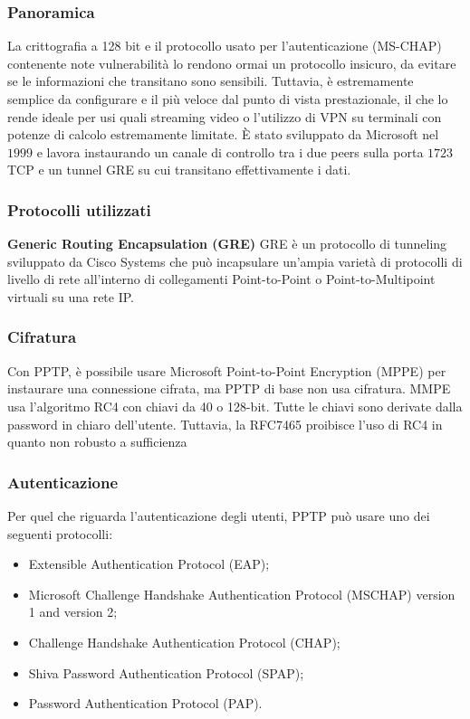 \subsubsection{Panoramica}
La crittografia a 128 bit e il protocollo usato per l'autenticazione (MS-CHAP) contenente note vulnerabilità lo rendono ormai un protocollo insicuro, da evitare se le informazioni che transitano sono sensibili.
Tuttavia, è estremamente semplice da configurare e il più veloce dal punto di vista prestazionale, il che lo rende ideale per usi quali streaming video o l'utilizzo di VPN su terminali con potenze di calcolo estremamente limitate.
È stato sviluppato da Microsoft nel $1999$ \cite[RFC2637]{RFC2637} e lavora instaurando un canale di controllo tra i due peers sulla porta $1723$ TCP e un tunnel GRE  su cui transitano effettivamente i dati.

\subsubsection{Protocolli utilizzati}
\noindent \textbf{Generic Routing Encapsulation (GRE)}
GRE \cite[RFC2784]{RFC2784} è un protocollo di tunneling sviluppato da Cisco Systems che può incapsulare un'ampia varietà di protocolli di livello di rete all'interno di collegamenti Point-to-Point o Point-to-Multipoint virtuali su una rete IP.

\subsubsection{Cifratura}
Con PPTP, è possibile usare Microsoft Point-to-Point Encryption (MPPE) per instaurare una connessione cifrata, ma PPTP di base non usa cifratura. MMPE usa l'algoritmo RC4 con chiavi da 40 o 128-bit. Tutte le chiavi sono derivate dalla password in chiaro dell'utente. Tuttavia, la RFC7465 proibisce l'uso di RC4 in quanto non robusto a sufficienza

\subsubsection{Autenticazione}
Per quel che riguarda l'autenticazione degli utenti, PPTP può usare uno dei seguenti protocolli:
\begin{itemize}
    \item Extensible Authentication Protocol (EAP);
    \item Microsoft Challenge Handshake Authentication Protocol (MSCHAP) version 1 and version 2;
    \item Challenge Handshake Authentication Protocol (CHAP);
    \item Shiva Password Authentication Protocol (SPAP);
    \item Password Authentication Protocol (PAP).
\end{itemize}

